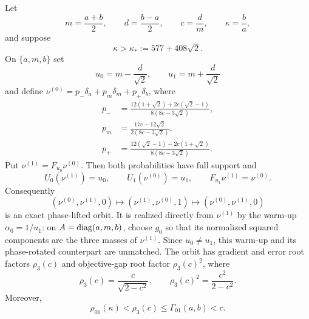 \documentclass[letterpaper,twoside]{article}
\begin{document}
\begin{theorem}
\label{thm:three-point-orbit}
Let
\[
 m=\frac{a+b}{2},\qquad d=\frac{b-a}{2},\qquad
 c=\frac dm,\qquad \kappa=\frac ba,
\]
and suppose
\begin{equation}\label{eq:three-point-threshold}
 \kappa>\kappa_*:=577+408\sqrt2.
\end{equation}
On $\{a,m,b\}$ set
\[
 u_0=m-\frac d{\sqrt2},
 \qquad
 u_1=m+\frac d{\sqrt2}
\]
and define $\nu^{(0)}=p_-\delta_a+p_m\delta_m+p_+\delta_b$, where
\begin{align}
 p_-&=\frac{12(1+\sqrt2)+2c(\sqrt2-1)}
 {8(8c-3\sqrt2)},\label{eq:three-point-weights-a}\\
 p_m&=\frac{17c-12\sqrt2}{2(8c-3\sqrt2)},\label{eq:three-point-weights-m}\\
 p_+&=\frac{12(\sqrt2-1)-2c(1+\sqrt2)}
 {8(8c-3\sqrt2)}.\label{eq:three-point-weights-b}
\end{align}
Put $\nu^{(1)}=F_{u_0}\nu^{(0)}$.  Then both probabilities have full
support and
\[
 U_0(\nu^{(1)})=u_0,
 \qquad U_1(\nu^{(0)})=u_1,
 \qquad F_{u_1}\nu^{(1)}=\nu^{(0)}.
\]
Consequently
\[
 (\nu^{(0)},\nu^{(1)},0)
 \longmapsto(\nu^{(1)},\nu^{(0)},1)
 \longmapsto(\nu^{(0)},\nu^{(1)},0)
\]
is an exact phase-lifted orbit.  It is realized directly from
$\nu^{(1)}$ by the warm-up $\alpha_0=1/u_1$: on
$A=\operatorname{diag}(a,m,b)$, choose $g_0$ so that its normalized squared components are
the three masses of $\nu^{(1)}$.  Since $u_0\ne u_1$, this warm-up and its
phase-rotated counterpart are unmatched.  The orbit has
gradient and error root factors $\rho_3(c)$ and objective-gap root factor
$\rho_3(c)^2$, where
\begin{equation}\label{eq:rho3}
 \rho_3(c)=\frac{c}{\sqrt{2-c^2}},
 \qquad
 \rho_3(c)^2=\frac{c^2}{2-c^2}.
\end{equation}
Moreover,
\begin{equation}\label{eq:rho3-lower-chain}
 \rho_{01}(\kappa)<\rho_3(c)
 \le\Gamma_{01}(a,b)<c.
\end{equation}
\end{theorem}
\end{document}
